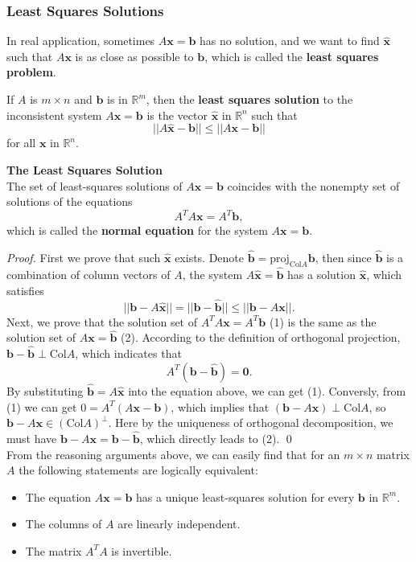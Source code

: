 \documentclass[10pt, a4paper]{article}
\newcommand{\R}{\mathbb{R}}
\newcommand{\vt}[1]{\mathbf{#1}}
\begin{document}
\subsubsection*{Least Squares Solutions}
\indent In real application, sometimes $A\vt{x}=\vt{b}$ has no solution, and we want to find $\hat{\vt{x}}$ such that $A\vt{x}$ is as close as possible to $\vt{b}$, which is called the \textbf{least squares problem}.
\begin{definition}
    If $A$ is $m\times n$ and $\vt{b}$ is in $\R^m$, then the \textbf{least squares solution} to the inconsistent system $A\vt{x}=\vt{b}$ is the vector $\hat{\vt{x}}$ in $\R^n$ such that\[
    ||A\hat{\vt{x}}-\vt{b}|| \leq ||A\vt{x}-\vt{b}||
    \]
    for all $\vt{x}$ in $\R^n$.
\end{definition}
\begin{proposition}
    \textbf{The Least Squares Solution}\\
    The set of least-squares solutions of $A\vt{x}=\vt{b}$ coincides with the nonempty set of solutions of the equations \[
    A^TA\vt{x} = A^T\vt{b},
    \]
    which is called the \textbf{normal equation} for the system $A\vt{x}=\vt{b}$.
\end{proposition}
\indent \textit{Proof.} First we prove that such $\hat{\vt{x}}$ exists. Denote $\hat{\vt{b}}=\text{proj}_{\text{Col}A}\vt{b}$, then since $\hat{\vt{b}}$ is a combination of column vectors of $A$, 
the system $A\hat{\vt{x}}=\hat{\vt{b}}$ has a solution $\hat{\vt{x}}$, which satisfies\[
||\vt{b}-A\hat{\vt{x}}||=||\vt{b}-\hat{\vt{b}}||\leq||\vt{b}-A\vt{x}||.
\]
\indent Next, we prove that the solution set of $A^TA\vt{x}=A^T\vt{b}$ (1) is the same as the solution set of $A\vt{x}=\hat{\vt{b}}$ (2). 
According to the definition of orthogonal projection, $\vt{b}-\vt{\hat{b}}\perp \text{Col}A$, which indicates that $$A^T(\vt{b}-\vt{\hat{b}})=\vt{0}.$$ 
By substituting $\vt{\hat{b}}=A\hat{\vt{x}}$ into the equation above, we can get (1). 
Conversly, from (1) we can get $0=A^T(A\vt{x}-\vt{b})$, which implies that $(\vt{b}-A\vt{x})\perp \text{Col}A$, so $\vt{b}-A\vt{x}\in (\text{Col}A)^\perp$.
 Here by the uniqueness of orthogonal decomposition, we must have $\vt{b}-A\vt{x}=\vt{b}-\hat{\vt{b}}$, which directly leads to (2). \qed\\
\indent From the reasoning arguments above, we can easily find that for an $m\times n$ matrix $A$ the following statements are logically equivalent:
\begin{itemize}
    \item The equation $A\vt{x}=\vt{b}$ has a unique least-squares solution for every $\vt{b}$ in $\R^m$.
    \item The columns of $A$ are linearly independent.
    \item The matrix $A^TA$ is invertible.
\end{itemize}
\end{document}
